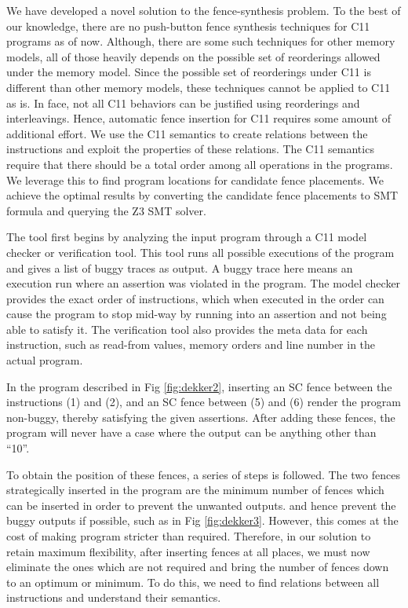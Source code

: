 We have developed a novel solution to the fence-synthesis problem. 
To the best of our knowledge, 
there are no push-button fence synthesis techniques for C11 
programs as of now. Although, there are some such techniques for 
other memory models, all of those heavily depends on the 
possible set of reorderings allowed under the memory model. 
Since the possible set of reorderings under C11 is different 
than other memory models, these techniques cannot be applied 
to C11 as is. In face, not all C11 behaviors can be justified 
using reorderings and interleavings. Hence, automatic fence insertion 
for C11 requires some amount of additional effort.
We use the C11 semantics to create relations between the 
instructions and exploit the properties of these relations. 
The C11 semantics require that there should be a total 
order among all \mosc operations in the programs. We leverage this to 
find program locations for candidate \mosc fence placements. We achieve 
the optimal results by converting the candidate fence placements to 
SMT formula and querying the Z3 SMT solver.

The tool first begins by analyzing the input program through a C11 model 
checker or verification tool. This tool runs all possible executions of 
the program and gives a list of buggy traces as output. A buggy trace 
here means an execution run where an assertion was violated in the program. 
The model checker provides the exact order of instructions, which when 
executed in the order can cause the program to stop mid-way by running 
into an assertion and not being able to satisfy it. The verification 
tool also provides the meta data for each instruction, such as read-from 
values, memory orders and line number in the actual program.

In the program described in Fig \ref{fig:dekker2}, inserting an SC fence 
between the instructions (1) and (2), and an SC fence between (5) and (6) 
render the program non-buggy, thereby satisfying the given assertions. 
After adding these fences, the program will never have a case where 
the output can be anything other than ``10''. 

To obtain the position of these fences, a series of steps is followed. 
The two fences strategically inserted in the program are the minimum 
number of fences which can be inserted in order to prevent the unwanted 
outputs.  and hence prevent the buggy outputs if possible, such as in Fig 
\ref{fig:dekker3}. However, this comes at the cost of making program 
stricter than required. Therefore, in our solution to retain maximum 
flexibility, after inserting fences at all places, we must now eliminate 
the ones which are not required and bring the number of fences down to 
an optimum or minimum. To do this, we need to find relations between 
all instructions and understand their semantics.

